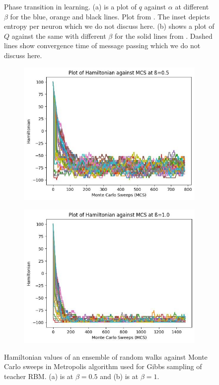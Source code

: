 \documentclass[%
 reprint,
 amsmath,amssymb,
 aps,
]{revtex4-2}
\begin{document}
\begin{figure}[]
\begin{subfigure}{0.49\columnwidth}
\subcaption{}
\end{subfigure}
\caption{\label{fig:phase} Phase transition in learning. (a) is a plot of $q$ against $\alpha$ at different $\beta$ for the blue, orange and black lines. Plot from \cite{huang2016unsupervised}. The inset depicts entropy per neuron which we do not discuss here. (b) shows a plot of $Q$ against the same with different $\beta$ for the solid lines from \cite{huang2021statistical_simplestModel}. Dashed lines show convergence time of message passing which we do not discuss here.}
\end{figure}
\begin{figure}[]
\begin{subfigure}{0.49\columnwidth}
\includegraphics[width=\linewidth]{metropolis_beta0.5.jpeg}
\subcaption{}
\end{subfigure}
\begin{subfigure}{0.49\columnwidth}
\includegraphics[width=\linewidth]{metropolis_beta1.jpeg}
\subcaption{}
\end{subfigure}
\caption{\label{fig:metropolis} Hamiltonian values of an ensemble of random walks against Monte Carlo sweeps in Metropolis algorithm used for Gibbs sampling of teacher RBM. (a) is at $\beta=0.5$ and (b) is at $\beta=1$.}
\end{figure}
\end{document}
